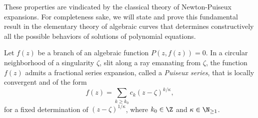 These properties are vindicated by the classical theory of Newton-Puiseux expansions. For completeness sake, we will state and prove this fundamental result in the elementary theory of algebraic curves that determines constructively all the possible behaviors of solutions of polynomial equations.

\begin{theorem}\label{thm:puiseux}
  Let $f(z)$ be a branch of an algebraic function $P(z,f(z)) = 0$. In a circular neighborhood of a singularity $\zeta$, slit along a ray emanating from $\zeta$, the function $f(z)$ admits a fractional series expansion, called a \textit{Puiseux series}, that is locally convergent and of the form $$ f(z) = \sum\limits_{k \geq k_{0}} c_{k}(z - \zeta)^{k/\kappa},$$
  for a fixed determination of $(z - \zeta)^{1/\kappa}$, where $k_{0} \in \Z$ and $\kappa \in \N_{\geq 1}$.
\end{theorem}

